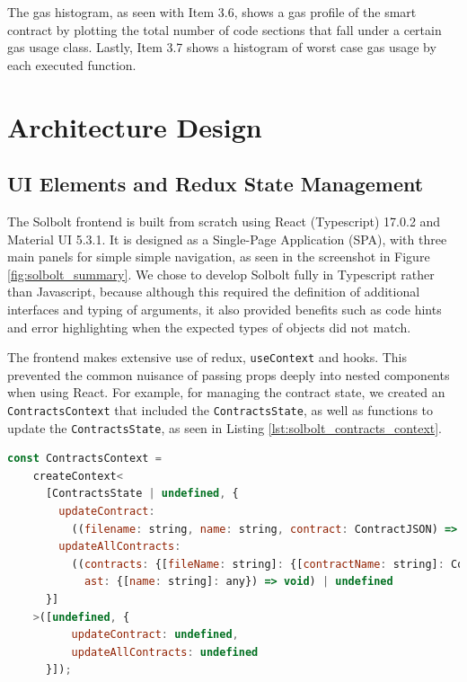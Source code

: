 The gas histogram,
as seen with Item 3.6, shows a gas profile of the smart contract by plotting the total number
of code sections that fall under a certain gas usage class. Lastly, Item 3.7 shows a histogram
of worst case gas usage by each executed function.



\section{Architecture Design}

\subsection{UI Elements and Redux State Management}
The Solbolt frontend is built from scratch using React (Typescript) 17.0.2 and Material UI 5.3.1.
It is designed as a Single-Page Application (SPA), with three main panels for simple
simple navigation, as seen in the screenshot in Figure \ref{fig:solbolt_summary}.
We chose to develop Solbolt fully in Typescript rather than Javascript, because although
this required the definition of additional interfaces and typing of arguments, it also
provided benefits such as code hints and error highlighting when the expected types of objects
did not match.

The frontend makes extensive use of redux, \texttt{useContext} and hooks. This prevented
the common nuisance of passing props deeply into nested components when using React.
For example, for managing the contract state, we created an \texttt{ContractsContext} that
included the \texttt{ContractsState}, as well as functions to update the 
\texttt{ContractsState}, as seen in Listing \ref{lst:solbolt_contracts_context}.


\begin{lstlisting}[language=Javascript, caption={\texttt{ContractsContext} used for managing contract state}, label={lst:solbolt_contracts_context}, basicstyle=\ttfamily\scriptsize]
  const ContractsContext = 
    createContext<
      [ContractsState | undefined, {
        updateContract: 
          ((filename: string, name: string, contract: ContractJSON) => void) | undefined, 
        updateAllContracts: 
          ((contracts: {[fileName: string]: {[contractName: string]: ContractJSON}}, 
            ast: {[name: string]: any}) => void) | undefined
      }]
    >([undefined, {
          updateContract: undefined, 
          updateAllContracts: undefined
      }]);
\end{lstlisting}

